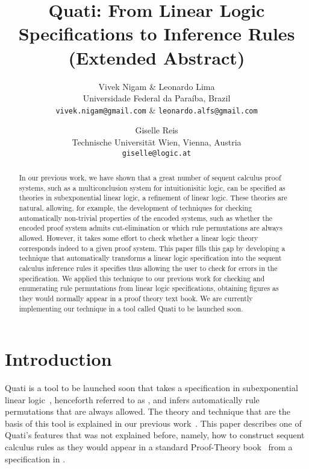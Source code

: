 \documentclass{ebl}
\title{Quati: From Linear Logic Specifications to Inference Rules (Extended Abstract)}
\author{Vivek Nigam \& Leonardo Lima \\
Universidade Federal da Paraíba, Brazil\\
\texttt{vivek.nigam@gmail.com} \& \texttt{leonardo.alfs@gmail.com} 
\and Giselle Reis\\
Technische Universit\"at Wien, Vienna, Austria\\
\texttt{giselle@logic.at}}
\begin{document}
\maketitle

\begin{abstract}
In our previous work, we have shown that a great number of sequent calculus proof systems, such 
as a multiconclusion system for intuitionisitic logic, can 
be specified as theories in subexponential linear logic, a refinement of linear logic. 
These theories are natural, allowing, for example, the development of techniques for checking
automatically non-trivial properties of the encoded systems, such as whether the encoded proof system 
admits cut-elimination or which rule permutations are always allowed. 
However, it takes some effort to check whether a linear logic theory corresponds
indeed to a given proof system. This paper fills this gap by developing a technique that automatically 
transforms a linear logic specification into the sequent calculus inference rules it specifies thus allowing
the user to check for errors in the specification. We applied this technique to our previous work for 
checking and enumerating rule permutations from linear logic specifications, obtaining figures
as they would normally appear in a proof theory text book. We are currently implementing our technique 
in a tool called Quati to be launched soon.
\end{abstract}

\section{Introduction}
Quati is a tool to be launched soon that takes a specification in subexponential
linear logic~\cite{nigam09ppdp}, henceforth referred to as \sell, and infers
automatically rule permutations that are always allowed. The theory and
technique that are the basis of this tool is explained in our previous
work~\cite{nigam13iclp}. This paper describes one of Quati's features that was
not explained before, namely, how to construct sequent calculus rules as they
would appear in a standard Proof-Theory book~\cite{troelstra96bpt} from a
specification in \sell.
\end{document}
